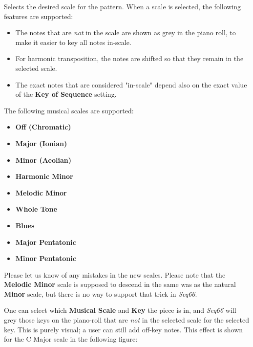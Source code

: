    Selects the desired scale for the pattern.
   When a scale is selected, the following features are supported:

   \begin{itemize}
      \item The notes that are \textsl{not}
         in the scale are shown as grey in the piano
         roll, to make it easier to key all notes in-scale.
      \item For harmonic transposition, the notes are shifted
         so that they remain in the selected scale.
      \item The exact notes that are considered "in-scale" depend also on the 
         exact value of the \textbf{Key of Sequence} setting.
   \end{itemize}

   The following musical scales are supported:

   \begin{itemize}
      \item \textbf{Off (Chromatic)}
      \item \textbf{Major (Ionian)}
      \item \textbf{Minor (Aeolian)}
      \item \textbf{Harmonic Minor}
      \item \textbf{Melodic Minor}
      \item \textbf{Whole Tone}
      \item \textbf{Blues}
      \item \textbf{Major Pentatonic}
      \item \textbf{Minor Pentatonic}
   \end{itemize}

   Please let us know of any mistakes in the new scales.
   Please note that the \textbf{Melodic Minor} scale is supposed to
   descend in the same was as the natural \textbf{Minor} scale, but
   there is no way to support that trick in \textsl{Seq66}.


   One can select which \textbf{Musical Scale} and
   \textbf{Key} the piece is in,
   and \textsl{Seq66} will grey those keys on the piano-roll that
   are \textsl{not} in the selected scale for the selected key.
   This is purely visual; a user can still add off-key notes.
   This effect is shown for the C Major scale in the following figure:

